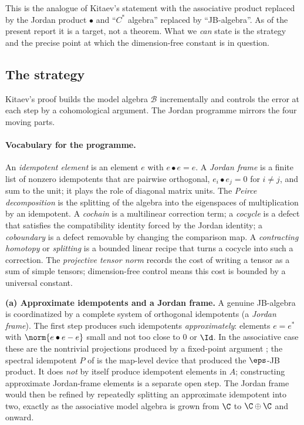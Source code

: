 This is the analogue of Kitaev's statement with the associative product replaced
by the Jordan product $\bullet$ and ``$C^{*}$ algebra'' replaced by
``JB-algebra''. As of the present report it is a target, not a theorem. What we
\emph{can} state is the strategy and the precise point at which the
dimension-free constant is in question.

\subsection{The strategy}

Kitaev's proof builds the model algebra $\mathcal{B}$ incrementally and controls
the error at each step by a cohomological argument. The Jordan programme mirrors
the four moving parts.

\paragraph{Vocabulary for the programme.}
An \emph{idempotent element} is an element $e$ with $e\bullet e=e$. A
\emph{Jordan frame} is a finite list of nonzero idempotents that are pairwise
orthogonal, $e_i\bullet e_j=0$ for $i\ne j$, and sum to the unit; it plays the
role of diagonal matrix units. The \emph{Peirce decomposition} is the splitting
of the algebra into the eigenspaces of multiplication by an idempotent. A
\emph{cochain} is a multilinear correction term; a \emph{cocycle} is a defect
that satisfies the compatibility identity forced by the Jordan identity; a
\emph{coboundary} is a defect removable by changing the comparison map. A
\emph{contracting homotopy} or \emph{splitting} is a bounded linear recipe that
turns a cocycle into such a correction. The \emph{projective tensor norm} records
the cost of writing a tensor as a sum of simple tensors; dimension-free control
means this cost is bounded by a universal constant.

\medskip
\noindent\textbf{(a) Approximate idempotents and a Jordan frame.}
A genuine JB-algebra is coordinatized by a complete system of orthogonal
idempotents (a \emph{Jordan frame}). The first step produces such idempotents
\emph{approximately}: elements $e=e^{*}$ with $\norm{e\bullet e-e}$ small and
not too close to $0$ or $\Id$. In the associative case these are the nontrivial
projections produced by a fixed-point argument \cite{Kitaev2024}; the spectral
idempotent $P$ of  is the map-level device that produced the
$\eps$-JB product. It does \emph{not} by itself produce idempotent elements in
$A$; constructing approximate Jordan-frame elements is a separate open step. The
Jordan frame would then be refined by repeatedly splitting an approximate
idempotent into two, exactly as the associative model algebra is grown from $\C$
to $\C\oplus\C$ and onward.

